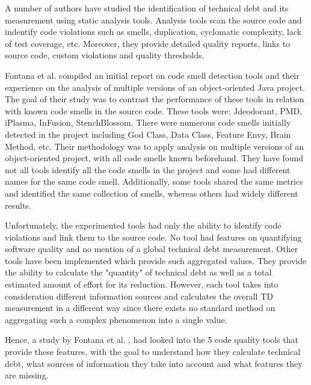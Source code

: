 \documentclass{mprop}
\begin{document}
A number of authors have studied the identification of technical debt and its
measurement using static analysis tools. Analysis tools scan the source code and
indentify code violations such as smells, duplication, cyclomatic
complexity, lack of test coverage, etc. Moreover, they provide detailed quality
reports, links to source code, custom violations and quality thresholds.

Fontana et al. \cite{Fontana2011} compiled an initial report on code smell
detection tools and their experience on the analysis of multiple versions of an
object-oriented Java project. The goal of their study was to contrast the
performance of these tools in relation with known code smells in the source
code. These tools were: Jdeodorant, PMD, iPlasma, InFusion, StenchBlossom. There
were numerous code smells initially detected in the project including God Class,
Data Class, Feature Envy, Brain Method, etc. Their methodology was to apply
analysis on multiple versions of an object-oriented project, with all code
smells known beforehand. They have found not all tools identify all the code
smells in the project and some had different names for the same code smell.
Additionally, some tools shared the same metrics and identified the same
collection of smells, whereas others had widely different results.

Unfortunately, the experimented tools had only the ability to identify code
violations and link them to the source code. No tool had features on quantifying
software quality and no mention of a global technical debt measurement. Other
tools have been implemented which provide such aggregated values. They provide
the ability to calculate the "quantity" of technical debt as well as a total
estimated amount of effort for its reduction. However, each tool takes into
consideration different information sources and calculates the overall TD
measurement in a different way since there exists no standard method on
aggregating such a complex phenomenon into a single value.

Hence, a study by Fontana et al. \cite{Fontana2016}, had looked into the 5 code
quality tools that provide these features, with the goal to understand how they
calculate technical debt, what sources of information they take into account and
what features they are missing.

\end{document}

